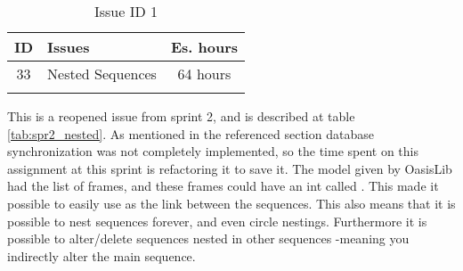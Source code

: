 \begin{longtable} { | c | p{12cm} | c | } 
\hline
	ID 	&	Issues	&		 Es. hours \\\hline
	33	&	Nested Sequences	&	64 hours	\\\hline
\caption{Issue ID 1}
\label{tab:spr4_nestedSequence}
\end{longtable}

This is a reopened issue from sprint 2, and is described at table \ref{tab:spr2_nested}. As mentioned in the referenced section database synchronization was not completely implemented, so the time spent on this assignment at this sprint is refactoring it to save it. The  model given by OasisLib had the list of frames, and these frames could have an int called . This made it possible to easily use  as the link between the sequences.
This also means that it is possible to nest sequences forever, and even circle nestings. Furthermore it is possible to alter/delete sequences nested in other sequences -meaning you indirectly alter the main sequence.